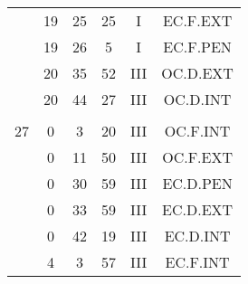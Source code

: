 \documentclass[12pt, a4paper]{article}
\begin{document}
\begin{multicols}{3}
{\begin{tabular}{c c c c c c}
	 	 	 	 & 19 & 25 & 25 & I & EC.F.EXT\\%
	 	 	 	 & 19 & 26 & 5 & I & EC.F.PEN\\%
	 	 	 	 & 20 & 35 & 52 & III & OC.D.EXT\\%
	 	 	 	 & 20 & 44 & 27 & III & OC.D.INT\\%
	 	 	 	 & & & & & \\%
	 	 	 	27 & 0 & 3 & 20 & III & OC.F.INT\\%
	 	 	 	 & 0 & 11 & 50 & III & OC.F.EXT\\%
	 	 	 	 & 0 & 30 & 59 & III & EC.D.PEN\\%
	 	 	 	 & 0 & 33 & 59 & III & EC.D.EXT\\%
	 	 	 	 & 0 & 42 & 19 & III & EC.D.INT\\%
	 	 	 	 & 4 & 3 & 57 & III & EC.F.INT\\%
	 	 \end{tabular}
 	}
\end{multicols}
\end{document}
